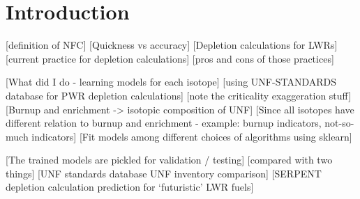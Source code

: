 \section{Introduction}
[definition of NFC]
[Quickness vs accuracy]
[Depletion calculations for LWRs]
[current practice for depletion calculations]
[pros and cons of those practices]

[What did I do - learning models for each isotope]
[using UNF-STANDARDS database for PWR depletion calculations]
[note the criticality exaggeration stuff]
[Burnup and enrichment -> isotopic composition of UNF]
[Since all isotopes have different relation to burnup and enrichment
    - example: burnup indicators, not-so-much indicators]
[Fit models among different choices of algorithms using sklearn]

[The trained models are pickled for validation / testing]
[compared with two things]
    [UNF standards database UNF inventory comparison]
    [SERPENT depletion calculation prediction for `futuristic' LWR fuels]

